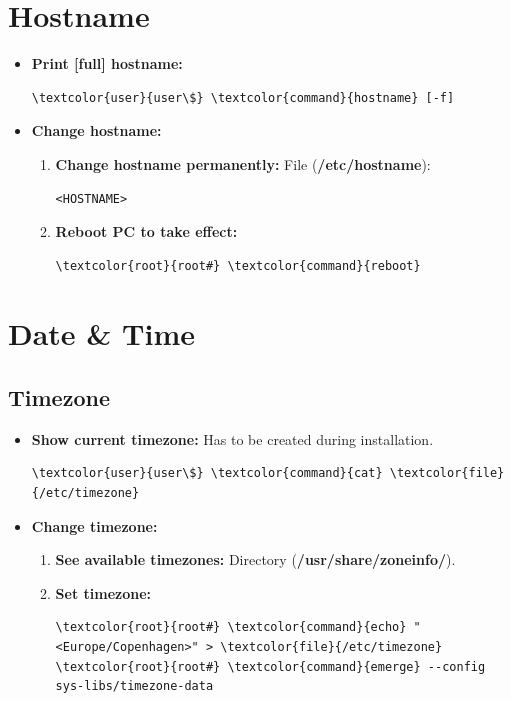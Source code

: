 \documentclass[10pt, a4paper, onecolumn, oneside, titlepage, openany]{book}
\begin{document}
\section{Hostname}
\begin{itemize}
    \item \textbf{Print [full] hostname:}
\begin{Verbatim}[commandchars=\\\{\}]
\textcolor{user}{user\$} \textcolor{command}{hostname} [-f]
\end{Verbatim}
    \item \textbf{Change hostname:}
    \begin{enumerate}
        \item \textbf{Change hostname permanently:}
\newline File (\textbf{\textcolor{file}{/etc/hostname}}):
\begin{verbatim}
<HOSTNAME>
\end{verbatim}
    \item \textbf{Reboot PC to take effect:}
\begin{Verbatim}[commandchars=\\\{\}]
\textcolor{root}{root#} \textcolor{command}{reboot}
\end{Verbatim}
    \end{enumerate}
\end{itemize}

\section{Date \& Time}
\subsection{Timezone}
\begin{itemize}
    \item \textbf{Show current timezone:}
\newline Has to be created during installation.
\begin{Verbatim}[commandchars=\\\{\}]
\textcolor{user}{user\$} \textcolor{command}{cat} \textcolor{file}{/etc/timezone}
\end{Verbatim}
    \item \textbf{Change timezone:}
    \begin{enumerate}
        \item \textbf{See available timezones:}
\newline Directory (\textbf{\textcolor{dir}{/usr/share/zoneinfo/}}).
        \item \textbf{Set timezone:}
\begin{Verbatim}[commandchars=\\\{\}]
\textcolor{root}{root#} \textcolor{command}{echo} "<Europe/Copenhagen>" > \textcolor{file}{/etc/timezone}
\textcolor{root}{root#} \textcolor{command}{emerge} --config sys-libs/timezone-data
\end{Verbatim}
    \end{enumerate}
\end{itemize}
\end{document}
